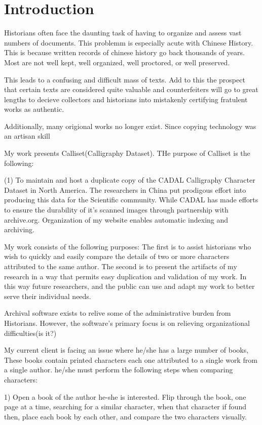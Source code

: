\chapter{Introduction}

Historians often face the daunting task of having to organize and assess vast numbers of documents.  This problemm is especially acute with Chinese History.  This is because written records of chinese history go back thousands of years.  Most are not well kept, well organized, well proctored, or well preserved.

This leads to a confusing and difficult mass of texts.  Add to this the prospect that certain texts are considered quite valuable and counterfeiters will go to great lengths to decieve collectors and historians into mistakenly certifying fratulent works as authentic.

Additionally, many origional works no longer exist.  Since copying technology was an artisan skill 

My work presents Calliset(Calligraphy Dataset).  THe purpose of Calliset is the following:

(1)  To maintain and host a duplicate copy of the CADAL Calligraphy Character Dataset in North America.  The researchers in China put prodigous effort into producing this data for the Scientific community\cite{Zhang:2011}.  While CADAL has made efforts to ensure the durability of it's scanned images through partnership with archive.org.  Organization of my website enables automatic indexing and archiving.


My work consists of the following purposes:
The first is to assist historians who wish to quickly and easily compare the details of two or more characters attributed to the same author.
The second is to present the artifacts of my research in a way that permits easy duplication and validation of my work.  In this way future researchers, and the public can use and adapt my work to better serve their individual needs.

Archival software exists to relive some of the administrative burden from Historians.  However, the software's primary focus is on relieving organizational difficulties(is it?)  

My current client is facing an issue where he/she has a large number of books,  These books contain printed characters each one attributed to a single work from a single author.  he/she must perform the following steps when comparing characters:

1)  Open a book of the author he-she is interested.  Flip through the book, one page at a time, searching for a similar character, when that character if found then, place each book by each other, and compare the two characters visually.

